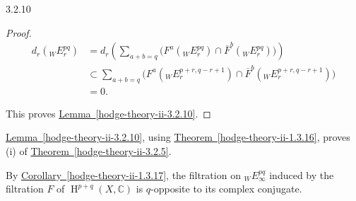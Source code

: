 \begin{lemma}{3.2.10}
\begin{proof}
      \[         \begin {aligned}           d_r({}_WE_r^{pq})           &= d_r\left (             \sum _{a+b=q} \Big (               F^a({}_WE_r^{pq}) \cap  \overline {F}^b({}_WE_r^{pq})             \Big )           \right )         \\&\subset  \sum _{a+b=q} \Big (             F^a({}_WE_r^{p+r,q-r+1}) \cap  \overline {F}^b({}_WE_r^{p+r,q-r+1})           \Big )         \\&= 0.         \end {aligned}       \]\par{}This proves \hyperref[hodge-theory-ii-3.2.10]{Lemma~\ref*{hodge-theory-ii-3.2.10}}.\end{proof}\end{lemma}\par{}\hyperref[hodge-theory-ii-3.2.10]{Lemma~\ref*{hodge-theory-ii-3.2.10}}, using \hyperref[hodge-theory-ii-1.3.16]{Theorem~\ref*{hodge-theory-ii-1.3.16}}, proves (i) of \hyperref[hodge-theory-ii-3.2.5]{Theorem~\ref*{hodge-theory-ii-3.2.5}}.\par{}By \hyperref[hodge-theory-ii-1.3.17]{Corollary~\ref*{hodge-theory-ii-1.3.17}}, the filtration on \({}_WE_\infty ^{pq}\) induced by the filtration \(F\) of \(\operatorname {H}^{p+q}(X,\mathbb {C})\) is \(q\)-opposite to its complex conjugate.
